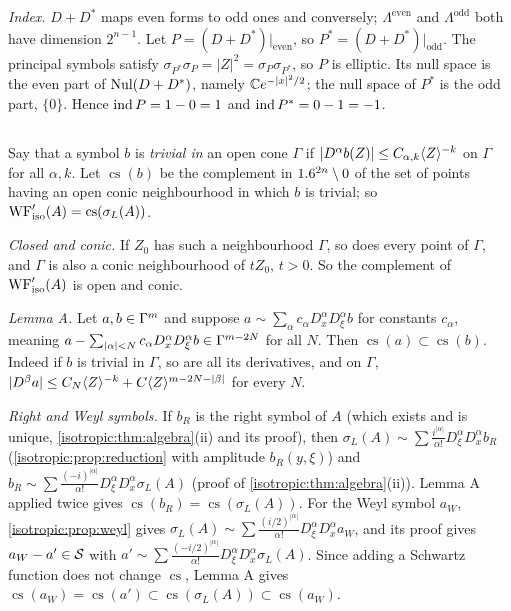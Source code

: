 \emph{Index.} $D+D^*$ maps even forms to odd ones and conversely; $\Lambda^{\mathrm{even}}$ and
$\Lambda^{\mathrm{odd}}$ both have dimension $2^{n-1}$. Let $P=(D+D^*)|_{\mathrm{even}}$, so
$P^*=(D+D^*)|_{\mathrm{odd}}$. The principal symbols satisfy $\sigma_{P^*}\sigma_P=|Z|^2=\sigma_P\sigma_{P^*}$,
so $P$ is elliptic. Its null space is the even part of $\operatorname{Nul}(D+D^*)$, namely $\mathbb{C} e^{-|x|^2/2}$; the null
space of $P^*$ is the odd part, $\{0\}$. Hence $\operatorname{ind} P=1-0=1$ and $\operatorname{ind} P^*=0-1=-1$.

\subsection*{}
Say that a symbol $b$ is \emph{trivial in} an open cone $\Gamma$ if
$|D^\alpha b(Z)|\le C_{\alpha,k}\langle Z\rangle^{-k}$ on $\Gamma$ for all $\alpha,k$. Let $\operatorname{cs}(b)$ be the
complement in $1.6^{2n}\setminus0$ of the set of points having an open conic neighbourhood in which
$b$ is trivial; so $\operatorname{WF}_{\mathrm{iso}}'(A)=\operatorname{cs}(\sigma_L(A))$.

\emph{Closed and conic.} If $Z_0$ has such a neighbourhood $\Gamma$, so does every point of $\Gamma$, and
$\Gamma$ is also a conic neighbourhood of $tZ_0$, $t>0$. So the complement of $\operatorname{WF}_{\mathrm{iso}}'(A)$ is open and
conic.

\emph{Lemma A.} Let $a,b\in\Gamma^{m}$ and suppose $a\sim\sum_\alpha c_\alpha D_x^\alpha D_\xi^\alpha b$ for constants
$c_\alpha$, meaning $a-\sum_{|\alpha|<N}c_\alpha D_x^\alpha D_\xi^\alpha b\in\Gamma^{m-2N}$ for all $N$. Then
$\operatorname{cs}(a)\subset\operatorname{cs}(b)$. Indeed if $b$ is trivial in $\Gamma$, so are all its
derivatives, and on $\Gamma$, $|D^\beta a|\le C_N\langle Z\rangle^{-k}+C\langle Z\rangle^{m-2N-|\beta|}$ for every $N$.

\emph{Right and Weyl symbols.} If $b_R$ is the right symbol of $A$ (which exists and is unique,
\cref{isotropic:thm:algebra}(ii) and its proof), then $\sigma_L(A)\sim\sum\frac{i^{|\alpha|}}{\alpha!}D_\xi^\alpha
D_x^\alpha b_R$ (\cref{isotropic:prop:reduction} with amplitude $b_R(y,\xi)$) and
$b_R\sim\sum\frac{(-i)^{|\alpha|}}{\alpha!}D_\xi^\alpha D_x^\alpha\sigma_L(A)$ (proof of
\cref{isotropic:thm:algebra}(ii)). Lemma A applied twice gives $\operatorname{cs}(b_R)=\operatorname{cs}(\sigma_L(A))$. For the
Weyl symbol $a_W$, \cref{isotropic:prop:weyl} gives
$\sigma_L(A)\sim\sum\frac{(i/2)^{|\alpha|}}{\alpha!}D_\xi^\alpha D_x^\alpha a_W$, and its proof gives $a_W-a'\in\mathcal{S}$
with $a'\sim\sum\frac{(-i/2)^{|\alpha|}}{\alpha!}D_\xi^\alpha D_x^\alpha\sigma_L(A)$. Since adding a Schwartz function
does not change $\operatorname{cs}$, Lemma A gives $\operatorname{cs}(a_W)=\operatorname{cs}(a')\subset\operatorname{cs}(\sigma_L(A))\subset\operatorname{cs}(a_W)$.

